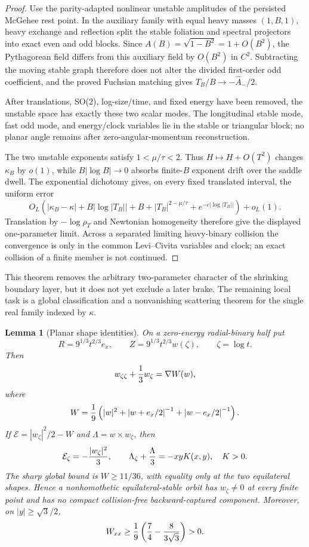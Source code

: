 \documentclass[11pt]{article}
\newtheorem{lemma}[theorem]{Lemma}
\begin{document}
\begin{proof}
Use the parity-adapted nonlinear unstable amplitudes of the persisted
McGehee rest point. In the auxiliary family with equal heavy masses
$(1,B,1)$, heavy exchange and reflection split the stable foliation and
spectral projectors into exact even and odd blocks. Since
$A(B)=\sqrt{1-B^2}=1+O(B^2)$, the Pythagorean field differs from this
auxiliary field by $O(B^2)$ in $C^2$. Subtracting the moving stable graph
therefore does not alter the divided first-order odd coefficient, and the
proved Fuchsian matching gives $T_B/B\to-\widehat A_-/2$.

After translations, SO(2), log-size/time, and fixed energy have been removed,
the unstable space has exactly these two scalar modes. The longitudinal
stable mode, fast odd mode, and energy/clock variables lie in the stable or
triangular block; no planar angle remains after zero-angular-momentum
reconstruction.

The two unstable exponents satisfy
$1<\mu/\tau<2$. Thus $H\mapsto H+O(T^2)$ changes $\kappa_B$ by $o(1)$, while
$B|\log B|\to0$ absorbs finite-$B$ exponent drift over the saddle dwell.
The exponential dichotomy gives, on every fixed translated interval, the
uniform error
\[
 O_L\!\left(
 |\kappa_B-\kappa|+B|\log|T_B||+B
 +|T_B|^{2-\mu/\tau}+e^{-c|\log|T_B||}\right)+o_L(1).
\]
Translation by $-\log\rho_T$ and Newtonian homogeneity therefore give the
displayed one-parameter limit. Across a separated
limiting heavy-binary collision the convergence is only in the common
Levi--Civita variables and clock; an exact collision of a finite member is
not continued.
\end{proof}

This theorem removes the arbitrary two-parameter character of the shrinking
boundary layer, but it does not yet exclude a later brake. The remaining
local task is a global classification and a nonvanishing scattering theorem
for the single real family indexed by $\kappa$.

\begin{lemma}[Planar shape identities]
On a zero-energy radial-binary half put
\[
 R=9^{1/3}t^{2/3}e_x,\qquad
 Z=9^{1/3}t^{2/3}w(\zeta),\qquad \zeta=\log t.
\]
Then
\[
 w_{\zeta\zeta}+{1\over3}w_\zeta=\nabla W(w),
\]
where
\[
 W={1\over9}\left(
 |w|^2+{|w+e_x/2|}^{-1}+{|w-e_x/2|}^{-1}\right).
\]
If $\mathcal E=|w_\zeta|^2/2-W$ and
$\Lambda=w\times w_\zeta$, then
\[
 \mathcal E_\zeta=-{|w_\zeta|^2\over3},\qquad
 \Lambda_\zeta+{\Lambda\over3}=-xyK(x,y),\quad K>0.
\]
The sharp global bound is $W\ge11/36$, with equality only at the two
equilateral shapes. Hence a nonhomothetic equilateral-stable orbit has
$w_\zeta\ne0$ at every finite point and has no compact collision-free
backward-captured component.
Moreover, on $|y|\ge\sqrt3/2$,
\[
 W_{xx}\ge {1\over9}\left({7\over4}-{8\over3\sqrt3}\right)>0.
\]
\end{lemma}
\end{document}
